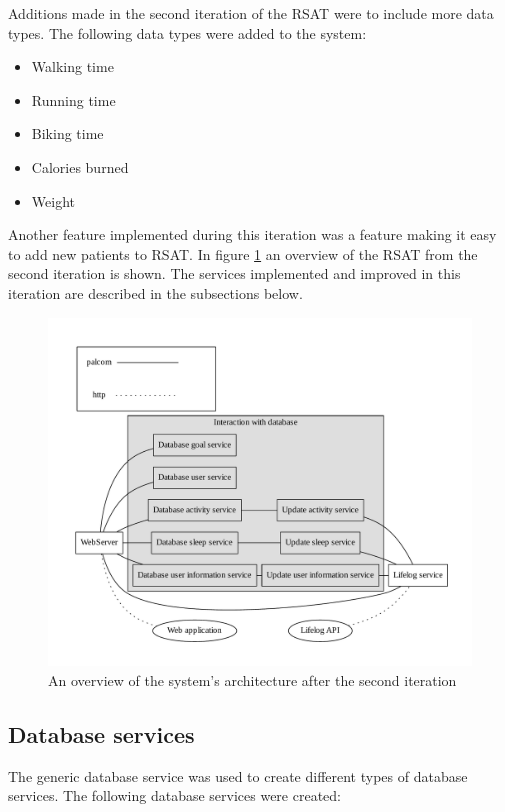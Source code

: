 \documentclass{cslthse-msc}
\begin{document}
Additions made in the second iteration of the RSAT were to include more data types. The following data types were added to the system: 

\begin{itemize}
	\item Walking time
	\item Running time
	\item Biking time
	\item Calories burned
	\item Weight
\end{itemize}

Another feature implemented during this iteration was a feature making it easy to add new patients to RSAT. In figure \ref{fig:second-itr} an overview of the RSAT from the second iteration is shown. The services implemented and improved in this iteration are described in the subsections below. 

\begin{figure}[!hbt]
\centering
\includegraphics[scale=0.65]{six-version.pdf} 
\caption{An overview of the system's architecture after the second iteration}\label{fig:second-itr}
\end{figure}


\subsection{Database services}

The generic database service was used to create different types of database services. The following database services were created: 
\end{document}
